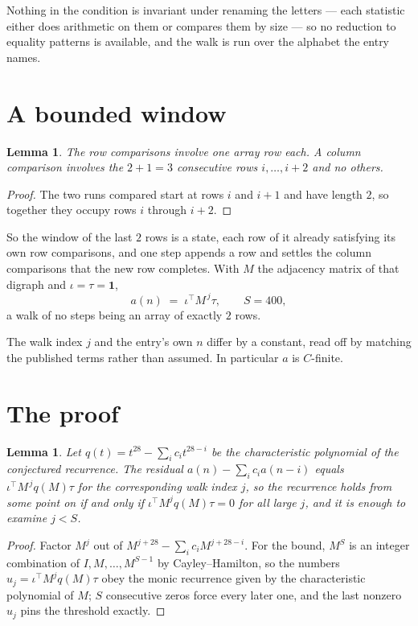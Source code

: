 \documentclass[11pt,a4paper]{article}
\theoremstyle{plain}
\newtheorem{lemma}[theorem]{Lemma}
\theoremstyle{definition}
\begin{document}
Nothing in the condition is invariant under renaming the letters --- each statistic either does
arithmetic on them or compares them by size --- so no reduction to equality patterns is
available, and the walk is run over the alphabet the entry names.

\section{A bounded window}

\begin{lemma}\label{lem:win}
The row comparisons involve one array row each. A column comparison involves the
$2+1=3$ consecutive rows $i,\dots,i{+}2$ and no others.
\end{lemma}

\begin{proof}
The two runs compared start at rows $i$ and $i+1$ and have length $2$, so together they
occupy rows $i$ through $i+2$.
\end{proof}

So the window of the last $2$ rows is a state, each row of it already satisfying its own row
comparisons, and one step appends a row and settles the column comparisons that the new row
completes. With $M$ the adjacency matrix of that digraph and $\iota=\tau=\mathbf{1}$,
\[
a(n)\;=\;\iota^{\!\top}M^{\,j}\tau ,\qquad S=400,
\]
a walk of no steps being an array of exactly $2$ rows.

The walk index $j$ and the entry's own $n$ differ by a constant, read off by matching the
published terms rather than assumed. In particular $a$ is $C$-finite.

\section{The proof}

\begin{lemma}\label{lem:crit}
Let $q(t)=t^{28}-\sum_i c_it^{28-i}$ be the characteristic polynomial of the
conjectured recurrence. The residual $a(n)-\sum_ic_ia(n-i)$ equals
$\iota^{\!\top}M^{\,j}q(M)\tau$ for the corresponding walk index $j$, so the recurrence
holds from some point on if and only if $\iota^{\!\top}M^{j}q(M)\tau=0$ for all large $j$,
and it is enough to examine $j<S$.
\end{lemma}

\begin{proof}
Factor $M^{j}$ out of $M^{j+28}-\sum_ic_iM^{j+28-i}$. For the bound, $M^{S}$
is an integer combination of $I,M,\dots,M^{S-1}$ by Cayley--Hamilton, so the numbers
$u_j=\iota^{\!\top}M^{j}q(M)\tau$ obey the monic recurrence given by the characteristic
polynomial of $M$; $S$ consecutive zeros force every later one, and the last nonzero $u_j$
pins the threshold exactly.
\end{proof}
\end{document}

